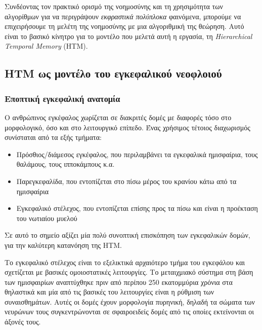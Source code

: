   Συνδέοντας τον πρακτικό ορισμό της νοημοσύνης και τη χρησιμότητα των αλγορίθμων για να περιγράψουν \textit{εκφραστικά πολύπλοκα} φαινόμενα,
  μπορούμε να επιχειρήσουμε τη μελέτη της νοημοσύνης με μια αλγοριθμική της θεώρηση.
  Αυτό είναι το βασικό κίνητρο για το μοντέλο που μελετά αυτή η εργασία, τη \textit{Hierarchical Temporal Memory} (HTM).

\subsection{HTM ως μοντέλο του εγκεφαλικού νεοφλοιού}

\subsubsection{Εποπτική εγκεφαλική ανατομία} \label{intro:brain_anatomy}

  Ο ανθρώπινος εγκέφαλος χωρίζεται σε διακριτές δομές με διαφορές τόσο στο μορφολογικό, όσο και στο λειτουργικό επίπεδο.
  Ένας χρήσιμος τέτοιος διαχωρισμός συνίσταται από τα εξής τμήματα:
  \begin{itemize}
    \item Πρόσθιος/διάμεσος εγκέφαλος, που περιλαμβάνει τα εγκεφαλικά ημισφαίρια, τους θαλάμους, τους ιπποκάμπους κ.α.
    \item Παρεγκεφαλίδα, που εντοπίζεται στο πίσω μέρος του κρανίου κάτω από τα ημισφαίρια
    \item Εγκεφαλικό στέλεχος, που εντοπίζεται επίσης προς τα πίσω και είναι η προέκταση του νωτιαίου μυελού
  \end{itemize}

  Σε αυτό το σημείο αξίζει μία πολύ συνοπτική επισκόπηση των εγκεφαλικών δομών, για την καλύτερη κατανόηση της HTM.

  Το εγκεφαλικό στέλεχος είναι το εξελικτικά αρχαιότερο τμήμα του εγκεφάλου και σχετίζεται με βασικές ομοιοστατικές λειτουργίες.
  Το μεταιχμιακό σύστημα στη βάση των ημισφαιρίων αναπτύχθηκε πριν από περίπου 250 εκατομμύρια χρόνια στα θηλαστικά
  και μία από τις βασικές του λειτουργίες είναι η ρύθμιση των συναισθημάτων.
  Αυτές οι δομές έχουν μορφολογία πυρηνική, δηλαδή τα σώματα των νευρώνων τους συγκεντρώνονται σε σφαιροειδείς δομές
  από τις οποίες εκτείνονται οι άξονές τους.

